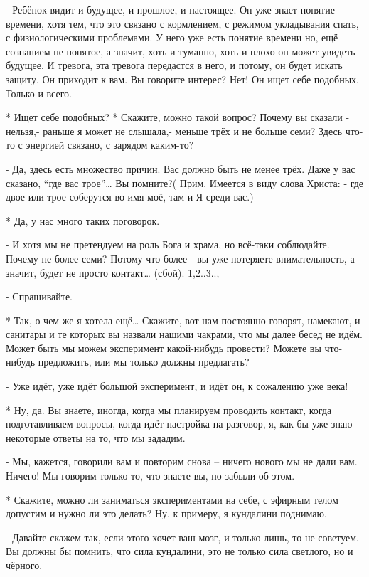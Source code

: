 - Ребёнок видит и будущее, и прошлое, и настоящее. Он уже знает понятие времени, хотя тем, что это связано с кормлением, с режимом укладывания спать, с физиологическими проблемами. У него уже есть понятие  времени но, ещё сознанием не понятое, а значит, хоть и туманно, хоть и плохо он может увидеть будущее. И тревога, эта тревога передастся в него, и потому, он будет искать защиту. Он приходит к вам. Вы говорите интерес? Нет! Он ищет себе подобных. Только и всего.

* Ищет себе подобных? 
* Скажите, можно такой вопрос? Почему вы сказали - нельзя,-  раньше я может не слышала,- меньше трёх и не больше семи? Здесь что-то с энергией связано, с зарядом каким-то?

- Да, здесь есть множество причин. Вас должно быть не менее трёх. Даже у вас сказано, “где вас трое”…  Вы помните?( Прим. Имеется в виду слова Христа: - где двое или трое соберутся во имя моё, там и Я среди вас.)

* Да, у нас много таких поговорок.

- И хотя мы не претендуем на роль Бога и  храма, но всё-таки соблюдайте. Почему не более семи? Потому что более - вы уже потеряете внимательность, а значит, будет не просто контакт… (сбой).
1,2..3..,

- Спрашивайте.

* Так, о чем же я хотела ещё… Скажите, вот нам постоянно говорят, намекают, и санитары и те которых вы назвали нашими чакрами, что мы далее бесед не идём. Может быть мы можем эксперимент какой-нибудь  провести? Можете вы что-нибудь предложить, или мы только должны предлагать?

- Уже идёт, уже идёт большой эксперимент, и идёт он, к сожалению уже века!

* Ну, да. Вы знаете, иногда, когда мы планируем проводить контакт, когда подготавливаем вопросы, когда идёт настройка на разговор, я, как бы уже знаю некоторые ответы на то, что мы зададим.

- Мы, кажется, говорили вам и повторим снова – ничего нового мы не дали вам. Ничего! Мы говорим только то, что знаете вы, но забыли об этом.

* Скажите, можно ли заниматься экспериментами на себе, с эфирным телом допустим и нужно ли это делать? Ну, к примеру, я кундалини поднимаю.

- Давайте скажем так, если этого хочет ваш мозг, и только лишь, то не советуем. Вы должны бы помнить, что сила кундалини, это не только сила светлого, но и чёрного.

